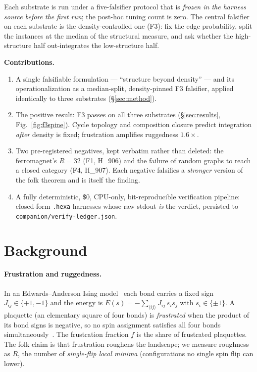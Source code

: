 \documentclass[11pt,a4paper]{article}
\begin{document}
Each substrate is run under a five-falsifier protocol that is \emph{frozen in
the harness source before the first run}; the post-hoc tuning count is zero. The
central falsifier on each substrate is the density-controlled one (F3): fix the
edge probability, split the instances at the median of the structural measure,
and ask whether the high-structure half out-integrates the low-structure half.

\medskip
\noindent\textbf{Contributions.}
\begin{enumerate}\itemsep0.3em
\item A single falsifiable formulation --- ``structure beyond density'' --- and
      its operationalization as a median-split, density-pinned F3 falsifier,
      applied identically to three substrates (\S\ref{sec:method}).
\item The positive result: F3 passes on all three substrates
      (\S\ref{sec:results}, Fig.~\ref{fig:f3spine}). Cycle topology and
      composition closure predict integration \emph{after} density is fixed;
      frustration amplifies ruggedness $1.6\times$.
\item Two pre-registered negatives, kept verbatim rather than deleted: the
      ferromagnet's $R{=}32$ (F1, H\_906) and the failure of random graphs to
      reach a closed category (F4, H\_907). Each negative falsifies a
      \emph{stronger} version of the folk theorem and is itself the finding.
\item A fully deterministic, $\$0$, CPU-only, bit-reproducible verification
      pipeline: closed-form \texttt{.hexa} harnesses whose raw stdout \emph{is}
      the verdict, persisted to \texttt{companion/verify-ledger.json}.
\end{enumerate}

\section{Background}
\label{sec:bg}

\paragraph{Frustration and ruggedness.}
In an Edwards--Anderson Ising model~\citep{edwardsanderson1975} each bond carries
a fixed sign $J_{ij} \in \{+1,-1\}$ and the energy is
$E(s) = -\sum_{\langle ij\rangle} J_{ij}\, s_i s_j$ with $s_i\in\{\pm1\}$. A
plaquette (an elementary square of four bonds) is \emph{frustrated} when the
product of its bond signs is negative, so no spin assignment satisfies all four
bonds simultaneously~\citep{toulouse1977}. The frustration fraction $f$ is the
share of frustrated plaquettes. The folk claim is that frustration roughens the
landscape; we measure roughness as $R$, the number of \emph{single-flip local
minima} (configurations no single spin flip can lower).
\end{document}
